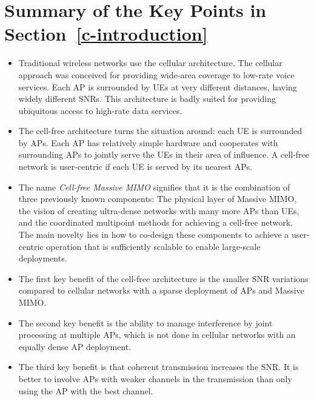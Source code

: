 \newpage

\section{Summary of the Key Points in Section~\ref{c-introduction}}
\label{c-introduction-definition-summary}

\begin{mdframed}[style=GrayFrame]

\begin{itemize}
\item Traditional wireless networks use the cellular architecture. The cellular approach was conceived for providing wide-area coverage to low-rate voice services. Each \gls{AP} is surrounded by \glspl{UE} at very different distances, having widely different \glspl{SNR}. This architecture is badly suited for providing ubiquitous access to high-rate data services.

\item The cell-free architecture turns the situation around: each \gls{UE} is surrounded by \glspl{AP}. Each \gls{AP} has relatively simple hardware and cooperates with surrounding APs to jointly serve the UEs in their area of influence. A cell-free network is user-centric if each UE is served by its nearest APs.

\item The name \emph{Cell-free Massive MIMO} signifies that it is the combination of three previously known components: The physical layer of Massive MIMO, the vision of creating ultra-dense networks with many more APs than UEs, and the coordinated multipoint methods for achieving a cell-free network. The main novelty lies in how to co-design these components to achieve a user-centric operation that is sufficiently scalable to enable large-scale deployments.

\item The first key benefit of the cell-free architecture is the smaller SNR variations compared to cellular networks with a sparse deployment of APs and Massive MIMO.

\item The second key benefit is the ability to manage interference by joint processing at multiple APs, which is not done in cellular networks with an equally dense AP deployment.

\item The third key benefit is that coherent transmission increases the SNR. It is better to involve APs with weaker channels in the transmission than only using the AP with the best channel.

\end{itemize}

\end{mdframed}
